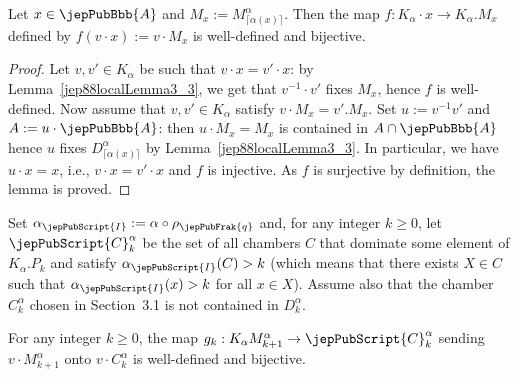 \begin{lemma}\label{jep88localLemma3_4}
Let $x\in\jepPubBbb{A}$ and $M_x:=M_{\lceil\alpha(x)\rceil}^\alpha$. Then the map $f:K_\alpha\cdot x\to K_\alpha.M_x$ defined by $f(v\cdot x):=v\cdot M_x$ is well-defined and bijective.
\end{lemma}
\begin{proof}
Let $v,v'\in K_\alpha$ be such that $v\cdot x=v'\cdot x$: by Lemma~\ref{jep88localLemma3_3}, we get that $v^{-1}\cdot v'$ fixes $M_x$, hence $f$ is well-defined. Now assume that $v,v'\in K_\alpha$ satisfy $v\cdot M_x=v'.M_x$. Set $u:=v^{-1}v'$ and $A:=u\cdot\jepPubBbb{A}$: then $u\cdot M_x=M_x$ is contained in $A\cap\jepPubBbb{A}$ hence $u$ fixes $D_{\lceil\alpha(x)\rceil}^\alpha$ by Lemma~\ref{jep88localLemma3_3}. In particular, we have $u\cdot x=x$, i.e., $v\cdot x=v'\cdot x$ and $f$ is injective. As $f$ is surjective by definition, the lemma is proved.
\end{proof}
Set $\alpha_{\jepPubScript{I}}:=\alpha\circ\rho_{\jepPubFrak{q}}$ and, for any integer $k\geqslant0$, let $\jepPubScript{C}_k^\alpha$ be the set of all chambers $C$ that dominate some element of $K_\alpha.P_k$ and satisfy $\alpha_{\jepPubScript{I}}(C)>k$ (which means that there exists $X\in C$ such that $\alpha_{\jepPubScript{I}}(x)>k$ for all $x\in X$). Assume also that the chamber $C_k^\alpha$ chosen in Section~3.1 is not contained in $D_k^\alpha$.
\begin{lemma}\label{jep88localLemma3_5}
For any integer $k\geqslant0$, the map $g_k:K_\alpha M_{k+1}^\alpha\to\jepPubScript{C}_k^\alpha$ sending $v\cdot M_{k+1}^\alpha$ onto $v\cdot C_k^\alpha$ is well-defined and bijective.
\end{lemma}
